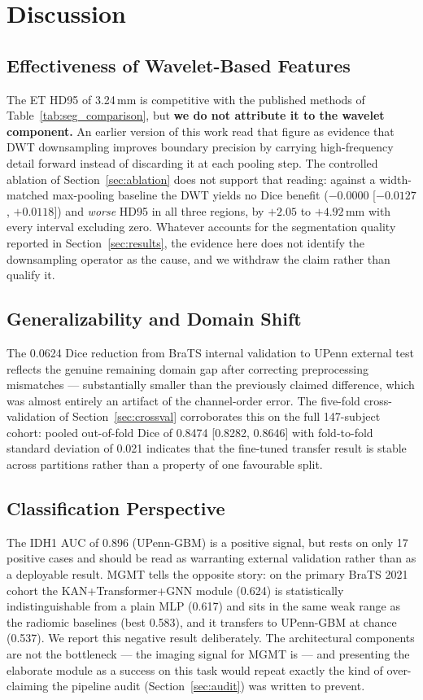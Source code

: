 \documentclass[conference]{IEEEtran}
\begin{document}
\section{Discussion}
\label{sec:discussion}

\subsection{Effectiveness of Wavelet-Based Features}
The ET HD95 of 3.24\,mm is competitive with the published methods of Table~\ref{tab:seg_comparison}, but \textbf{we do not attribute it to the wavelet component.} An earlier version of this work read that figure as evidence that DWT downsampling improves boundary precision by carrying high-frequency detail forward instead of discarding it at each pooling step. The controlled ablation of Section~\ref{sec:ablation} does not support that reading: against a width-matched max-pooling baseline the DWT yields no Dice benefit ($-0.0000$ [$-0.0127$, $+0.0118$]) and \emph{worse} HD95 in all three regions, by $+2.05$ to $+4.92$\,mm with every interval excluding zero. Whatever accounts for the segmentation quality reported in Section~\ref{sec:results}, the evidence here does not identify the downsampling operator as the cause, and we withdraw the claim rather than qualify it.

\subsection{Generalizability and Domain Shift}
The 0.0624 Dice reduction from BraTS internal validation to UPenn external test reflects the genuine remaining domain gap after correcting preprocessing mismatches --- substantially smaller than the previously claimed difference, which was almost entirely an artifact of the channel-order error. The five-fold cross-validation of Section~\ref{sec:crossval} corroborates this on the full 147-subject cohort: pooled out-of-fold Dice of 0.8474 [0.8282, 0.8646] with fold-to-fold standard deviation of 0.021 indicates that the fine-tuned transfer result is stable across partitions rather than a property of one favourable split.

\subsection{Classification Perspective}
The IDH1 AUC of 0.896 (UPenn-GBM) is a positive signal, but rests on only 17 positive cases and should be read as warranting external validation rather than as a deployable result. MGMT tells the opposite story: on the primary BraTS 2021 cohort the KAN+Transformer+GNN module (0.624) is statistically indistinguishable from a plain MLP (0.617) and sits in the same weak range as the radiomic baselines (best 0.583), and it transfers to UPenn-GBM at chance (0.537). We report this negative result deliberately. The architectural components are not the bottleneck --- the imaging signal for MGMT is --- and presenting the elaborate module as a success on this task would repeat exactly the kind of over-claiming the pipeline audit (Section~\ref{sec:audit}) was written to prevent.
\end{document}
